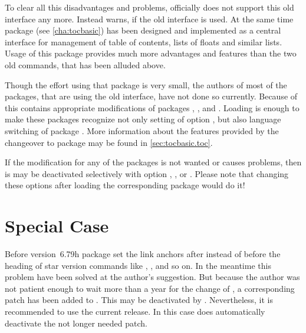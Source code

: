 To clear all this disadvantages and problems, \KOMAScript{} officially does not
support this old interface any more. Instead \KOMAScript{} warns, if the old
interface is used. At the same time package
 (see
\autoref{cha:tocbasic}) has been designed and implemented as a central
interface for management of table of contents, lists of floats and similar
lists. Usage of this package provides much more advantages and features than
the two old commands, that has been alluded above.

Though the effort using that package is very small, the authors of most of the
packages, that are using the old interface, have not done so currently. Because
of this  contains appropriate modifications of packages
,
, and
. Loading  is enough
to make these packages recognize not only setting of \KOMAScript{} option
, but also language
switching of package . More information
about the features provided by the changeover to package 
may be found in \autoref{sec:tocbasic.toc}.

If the modification for any of the packages is not wanted or causes problems,
then is may be deactivated selectively with option
,
,
or
.
Please note that changing these options after loading the
corresponding package would do it!


\section{Special Case }
\label{sec:scrhack.hyperref}

Before version~6.79h package  set the link anchors after
instead of before the heading of star version commands like ,
, and so on. In the meantime this problem have been solved at
the \KOMAScript{} author's suggestion. But because the \KOMAScript{} author
was not patient enough to wait more than a year for the change of
, a corresponding patch has been added to
. This may be deactivated by
. Nevertheless, it is recommended to use the
current  release. In this case  does
automatically deactivate the not longer needed patch.%
%

\endinput


